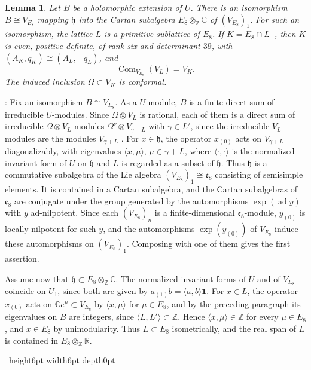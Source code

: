 \documentclass[leqno]{article}
\newcommand{\Cbb}{\ensuremath{\mathbb{C}}}
\newcommand{\Z}{\ensuremath{\mathbb{Z}}}
\newcommand{\R}{\ensuremath{\mathbb{R}}}
\newcommand{\qed}{\hfill \vrule height6pt  width6pt depth0pt}
\newcommand{\ot}{\otimes}
\newtheorem{lemma}[thm]{Lemma}
\newenvironment{proof}[1][]{\noindent {\it Proof #1} : }{\hbox{~}\qed
\smallskip
}
\numberwithin{equation}{section}
\begin{document}
\begin{lemma}
\label{lem:actual-lattice}
Let $B$ be a holomorphic extension of $U$. There is an isomorphism $B \cong V_{E_8}$ mapping $\mathfrak h$ into the Cartan subalgebra $E_8 \ot_\Z \Cbb$ of $(V_{E_8})_1$. For such an isomorphism, the lattice $L$ is a primitive sublattice of $E_8$. If $K = E_8 \cap L^\perp$, then $K$ is even, positive-definite, of rank six and determinant $39$, with $(A_K,q_K) \cong (A_L,-q_L)$, and
\begin{equation}
\label{eq:lattice-commutant}
\operatorname{Com}_{V_{E_8}}(V_L) = V_K.
\end{equation}
The induced inclusion $\Omega \subset V_K$ is conformal.
\end{lemma}

\begin{proof}
Fix an isomorphism $B \cong V_{E_8}$. As a $U$-module, $B$ is a finite direct sum of irreducible $U$-modules. Since $\Omega \ot V_L$ is rational, each of them is a direct sum of irreducible $\Omega \ot V_L$-modules $\Omega^\nu \ot V_{\gamma+L}$ with $\gamma \in L'$, since the irreducible $V_L$-modules are the modules $V_{\gamma+L}$ \cite{Don93}. For $x \in \mathfrak h$, the operator $x_{(0)}$ acts on $V_{\gamma+L}$ diagonalizably, with eigenvalues $\langle x,\mu\rangle$, $\mu \in \gamma+L$, where $\langle\cdot,\cdot\rangle$ is the normalized invariant form of $U$ on $\mathfrak h$ and $L$ is regarded as a subset of $\mathfrak h$. Thus $\mathfrak h$ is a commutative subalgebra of the Lie algebra $(V_{E_8})_1 \cong \mathfrak e_8$ consisting of semisimple elements. It is contained in a Cartan subalgebra, and the Cartan subalgebras of $\mathfrak e_8$ are conjugate under the group generated by the automorphisms $\exp(\operatorname{ad} y)$ with $y$ ad-nilpotent. Since each $(V_{E_8})_n$ is a finite-dimensional $\mathfrak e_8$-module, $y_{(0)}$ is locally nilpotent for such $y$, and the automorphisms $\exp(y_{(0)})$ of $V_{E_8}$ induce these automorphisms on $(V_{E_8})_1$. Composing with one of them gives the first assertion.

Assume now that $\mathfrak h \subset E_8 \ot_\Z \Cbb$. The normalized invariant forms of $U$ and of $V_{E_8}$ coincide on $U_1$, since both are given by $a_{(1)}b = \langle a,b\rangle\mathbf 1$. For $x \in L$, the operator $x_{(0)}$ acts on $\Cbb e^\mu \subset V_{E_8}$ by $\langle x,\mu\rangle$ for $\mu \in E_8$, and by the preceding paragraph its eigenvalues on $B$ are integers, since $\langle L,L'\rangle \subset \Z$. Hence $\langle x,\mu\rangle \in \Z$ for every $\mu \in E_8$, and $x \in E_8$ by unimodularity. Thus $L \subset E_8$ isometrically, and the real span of $L$ is contained in $E_8 \ot_\Z \R$.


\end{proof}
\end{document}
